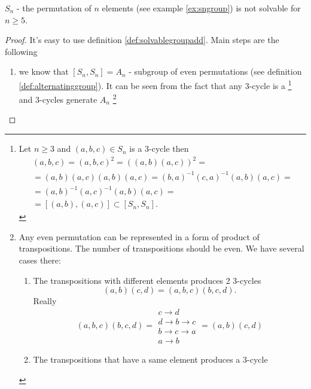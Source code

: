 \begin{theorem}[$S_n$ solvability]
  $S_n$ - the permutation of $n$ elements (see example
  \ref{ex:sngroup}) is not solvable for $n \ge 5$. 
  \begin{proof}
    It's easy to use definition \ref{def:solvablegroupadd}.
    Main steps are the following
    \begin{enumerate}
      \item we know that $\left[S_n, S_n\right] = A_n$ - subgroup of
        even permutations (see definition
        \ref{def:alternatinggroup}). It can be seen from the fact that
        any 3-cycle is a 
        \footnote{
          Let $n \ge 3$ and $(a,b,c) \in S_n$ is a 3-cycle then
          \begin{eqnarray}
            (a,b,c) = (a,b,c)^2 =
            \left((a,b)(a,c)\right)^2 =
            \nonumber \\
            = (a,b)(a,c)(a,b)(a,c) =
            (b,a)^{-1}(c,a)^{-1}(a,b)(a,c) =
            \nonumber \\
            =
            (a,b)^{-1}(a,c)^{-1}(a,b)(a,c) =
            \nonumber \\
            =
            \left[
              (a,b),(a,c)
              \right] \subset \left[S_n, S_n\right].
            \nonumber
          \end{eqnarray}
        }
        and 3-cycles
        generate $A_n$
        \footnote{
          Any even permutation can be represented in a form of product
          of transpositions. The number of transpositions should be
          even. We have several cases there:
          \begin{enumerate}
            \item The transpositions with different elements produces
              2 3-cycles
              \[
              (a,b)(c,d) = (a,b,c)(b,c,d).
              \]
              Really
              \[
              (a,b,c)(b,c,d) = 
              \begin{array}{c}
                c \to d \\
                d \to b \to c \\
                b \to c \to a \\
                a \to b 
              \end{array} =
              (a,b)(c,d)
              \]
            \item The transpositions that have a same element produces
              a 3-cycle
              \[
\]
\end{enumerate}}
\end{enumerate}
\end{proof}
\end{theorem}
